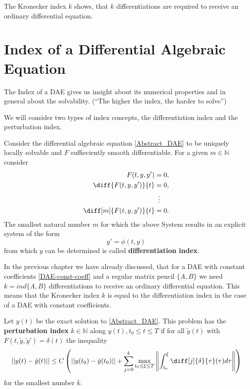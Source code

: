 The Kronecker index $k$ shows, that $k$ differentiations are required to receive an ordinary differential equation.

\section{Index of a Differential Algebraic Equation}

The Index of a DAE gives us insight about its numerical properties and in general about the solvability. (``The higher the index, the harder to solve'')

We will consider two types of index concepts, the differentiation index and the perturbation index.

\begin{definition}
	Consider the differential algebraic equation \ref{Abstract_DAE} to be uniquely locally solvable and $F$ suffieciently smooth differentiable. For a given $m \in \mathbb{N}$ consider
	\begin{displaymath}
		\begin{aligned}
			F(t,y,y') &= 0, \\
			\diff{F(t,y,y')}{t} &= 0, \\
			&\vdotswithin{=} \\
			\diff[m]{F(t,y,y')}{t} &= 0.
		\end{aligned}
	\end{displaymath}
	The smallest natural number $m$ for which the above System results in an explicit system of the form
	\begin{displaymath}
		y' = \phi(t,y)
	\end{displaymath}
	from which $y$ can be determined is called \textbf{differentiation index}.
\end{definition}

In the previous chapter we have already discussed, that for a DAE with constant coefficients \ref{DAE-const-coeff} and a regular matrix pencil $\{A,B\}$  we need $k = ind\{A,B\}$ differentiations to receive an ordinary differential equation. This means that the Kronecker index $k$ is equal to the differentiation index in the case of a DAE with constant coefficients.

\begin{definition}
	Let $y(t)$ be the exact solution to \ref{Abstract_DAE}. This problem has the \textbf{perturbation index} $k \in \mathbb{N}$ along $y(t), t_0 \leq t \leq T$ if for all  $\tilde{y}(t)$ with $F(t, \tilde{y}, \tilde{y}') = \delta(t)$ the inequality
	\begin{displaymath}
		||y(t)-\tilde{y}(t)|| \leq C \left(||y(t_0)-\tilde{y}(t_0)||+\sum_{j=0}^{k}\max_{t_0 \leq \xi \leq T} \left\rVert 		\int_{t_0}^{\xi}\diff[j]{\delta}{\tau}(\tau)d \tau \right\rVert \right)
	\end{displaymath}
	for the smallest number $k$.
\end{definition}	

